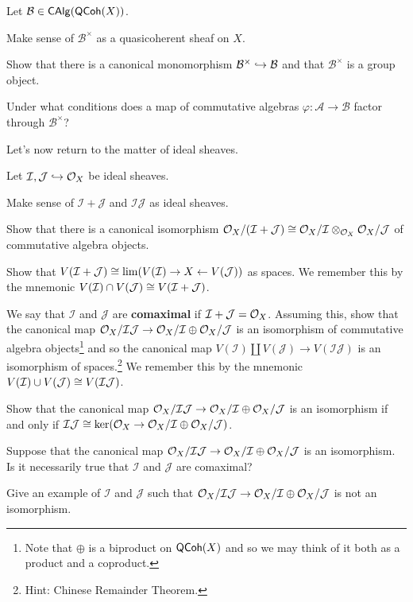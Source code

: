 \documentclass[11pt]{article}
\renewcommand{\AA}{\mathcal{A}}
\newcommand{\BB}{\mathcal{B}}
\newcommand{\I}{\mathcal{I}}
\newcommand{\J}{\mathcal{J}}
\renewcommand{\phi}{\varphi}
\begin{document}
\begin{exercise}
Let $\BB\in\CAlg(\QCoh(X))$. 
\begin{enum}{\alph}
\item Make sense of $\BB^{\times}$ as a quasicoherent sheaf on $X$.

\item Show that there is a canonical monomorphism $\BB^{\times}\inj\BB$ and that $\BB^{\times}$ is a group object.

\item Under what conditions does a map of commutative algebras $\phi: \AA\to\BB$ factor through $\BB^{\times}$?
\end{enum}
\end{exercise}

Let's now return to the matter of ideal sheaves. 

\begin{exercise}
Let $\I,\J\inj\O_X$ be ideal sheaves. 
\begin{enum}{\alph}
\item Make sense of $\I+\J$ and $\I\J$ as ideal sheaves.

\item Show that there is a canonical isomorphism $\O_X/(\I+\J)\iso\O_X/\I\tensor_{\O_X}\O_X/\J$ of commutative algebra objects.

\item Show that $V(\I+\J)\iso\lim(V(\I)\rightarrow X\leftarrow V(\J))$ as spaces. We remember this by the mnemonic $V(\I)\cap V(\J)\iso V(\I+\J)$.

\item We say that $\I$ and $\J$ are \textbf{comaximal} if $\I+\J=\O_X$. Assuming this, show that the canonical map $\O_X/\I\J\to\O_X/\I\oplus\O_X/\J$ is an isomorphism of commutative algebra objects\footnote{Note that $\oplus$ is a biproduct on $\operatorname{\mathsf{QCoh}}(X)$ and so we may think of it both as a product and a coproduct.} and so the canonical map $V(\I)\coprod V(\J)\to V(\I\J)$ is an isomorphism of spaces.\footnote{Hint: Chinese Remainder Theorem.} We remember this by the mnemonic $V(\I)\cup V(\J)\iso V(\I\J)$. 

\item Show that the canonical map $\O_X/\I\J\to\O_X/\I\oplus\O_X/\J$ is an isomorphism if and only if $\I\J\iso\ker(\O_X\to\O_X/\I\oplus\O_X/\J)$.

\item Suppose that the canonical map $\O_X/\I\J\to\O_X/\I\oplus\O_X/\J$ is an isomorphism. Is it necessarily true that $\I$ and $\J$ are comaximal?

\item Give an example of $\I$ and $\J$ such that $\O_X/\I\J\to\O_X/\I\oplus\O_X/\J$ is not an isomorphism.
\end{enum}
\end{exercise}
\end{document}
